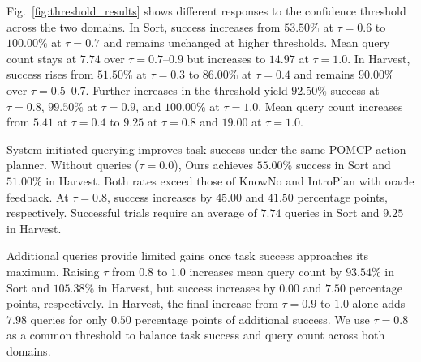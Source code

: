 Fig.~\ref{fig:threshold_results} shows different responses to the confidence threshold across the two domains. In Sort, success increases from $53.50\%$ at $\tau=0.6$ to $100.00\%$ at $\tau=0.7$ and remains unchanged at higher thresholds. Mean query count stays at $7.74$ over $\tau=0.7$–$0.9$ but increases to $14.97$ at $\tau=1.0$. In Harvest, success rises from $51.50\%$ at $\tau=0.3$ to $86.00\%$ at $\tau=0.4$ and remains $90.00\%$ over $\tau=0.5$–$0.7$. Further increases in the threshold yield $92.50\%$ success at $\tau=0.8$, $99.50\%$ at $\tau=0.9$, and $100.00\%$ at $\tau=1.0$. Mean query count increases from $5.41$ at $\tau=0.4$ to $9.25$ at $\tau=0.8$ and $19.00$ at $\tau=1.0$.

System-initiated querying improves task success under the same POMCP action planner. Without queries ($\tau=0.0$), Ours achieves $55.00\%$ success in Sort and $51.00\%$ in Harvest. Both rates exceed those of KnowNo and IntroPlan with oracle feedback. At $\tau=0.8$, success increases by $45.00$ and $41.50$ percentage points, respectively. Successful trials require an average of $7.74$ queries in Sort and $9.25$ in Harvest.

Additional queries provide limited gains once task success approaches its maximum. Raising $\tau$ from $0.8$ to $1.0$ increases mean query count by $93.54\%$ in Sort and $105.38\%$ in Harvest, but success increases by $0.00$ and $7.50$ percentage points, respectively. In Harvest, the final increase from $\tau=0.9$ to $1.0$ alone adds $7.98$ queries for only $0.50$ percentage points of additional success. We use $\tau=0.8$ as a common threshold to balance task success and query count across both domains.



